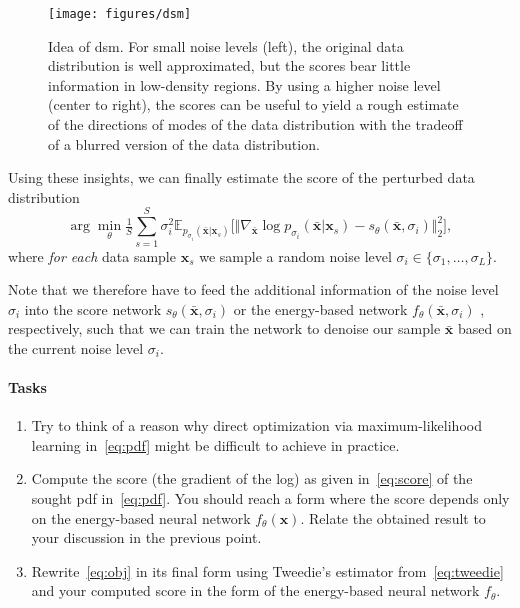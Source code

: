 \documentclass{article}
\renewcommand{\vec}[1]{\textbf{#1}}
\renewcommand{\vec}[1]{\textbf{#1}}
\begin{document}
\begin{figure}[H]
\begin{center}
\texttt{[image: figures/dsm]}\caption{Idea of \gls{dsm}. For small noise levels (left), the original data distribution is well approximated, but the scores bear little information in low-density regions. By using a higher noise level (center to right), the scores can be useful to yield a rough estimate of the directions of modes of the data distribution with the tradeoff of a blurred version of the data distribution.}\label{fig:dsm}
\end{center}
\end{figure}

Using these insights, we can finally estimate the score of the perturbed data distribution 
\begin{equation}\label{eq:obj}
\arg \min_\theta \tfrac 1 S\sum_{s=1}^S \sigma_i^2 \mathbb{E}_{p_{\sigma_i} (\bar{\vec x}|\vec x_s)} \big [\Vert \nabla_{\bar{\vec x}} \log p_{\sigma_i}(\bar{ \vec x}|\vec x_s) -  s_\theta (\bar{\vec x}, \sigma_i) \Vert_2^2 \big ],
\end{equation}
where \textit{for each} data sample $\vec x_s$ we sample a random noise level $\sigma_i \in \{\sigma_1,\dots,  \sigma_L\}$. 

Note that we therefore have to feed the additional information of the noise level $\sigma_i$ into the score network $s_\theta (\bar{\vec x}, \sigma_i)$ or the energy-based network $f_\theta (\bar{\vec x}, \sigma_i)$ , respectively, such that we can train the network to denoise our sample $\bar{\vec x}$ based on the current noise level $\sigma_i$. 

\paragraph{Tasks}
\begin{enumerate}
\item Try to think of a reason why direct optimization via maximum-likelihood learning in~\eqref{eq:pdf} might be difficult to achieve in practice. 
\item Compute the score (the gradient of the log) as given in~\eqref{eq:score} of the sought \gls{pdf} in~\eqref{eq:pdf}. You should reach a form where the score depends only on the energy-based neural network $f_\theta(\vec x)$. Relate the obtained result to your discussion in the previous point. 
\item Rewrite~\eqref{eq:obj} in its final form using Tweedie's estimator from~\eqref{eq:tweedie} and your computed score in the form of the energy-based neural network $f_\theta$.  %
\end{enumerate}
\end{document}
